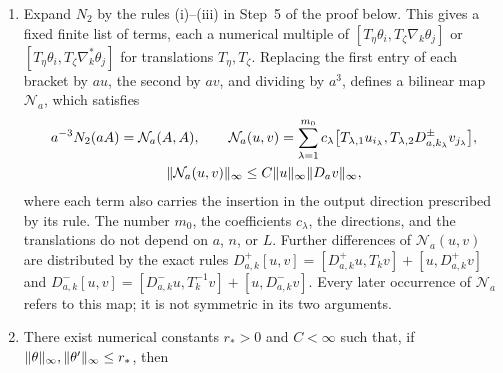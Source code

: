 \begin{lemma}
\begin{enumerate}
\[\]
With $\mathcal J(\theta)=(e^{\ad\theta}-\Id)/\ad\theta$, the resulting velocity in logarithmic coordinates is $\mathcal J(\theta)^{-1}(-4\nabla\sum_pq+G_U\phi)$, and it has the expansion
\[
 \begin{gathered}
 \partial_s\theta=-H_0\theta+N_2(\theta)+R_3(\theta),\qquad
 N_2=-C_0^*\mathfrak q-D\mathfrak q(\theta)^*C_0\theta+G_2(\theta),\\
 (G_2)_i(x)=\frac12\bigl[\theta_i(x),(d_0^*\theta)(x)+(d_0^*\theta)(x+ae_i)\bigr].
 \end{gathered}
\]
The adjoint is given by
\[
 z_{p,k}=\frac12\Bigl[\sum_{l>k}v_{p,l}-\sum_{l<k}v_{p,l},\,y_p\Bigr],\qquad
 D\mathfrak q(\theta)^*y=\sum_{p,k}\epsilon_{p,k}T_{p,k}^*z_{p,k},
\]
where $v_{p,k}=\epsilon_{p,k}T_{p,k}\theta_{\mathrm{dir}(p,k)}$ with $\epsilon_{p,k}\in\{\pm1\}$ and a translation $T_{p,k}$, and $T_{p,k}^*$ also inserts the result in the direction $\mathrm{dir}(p,k)$.
\item Expand $N_2$ by the rules (i)--(iii) in Step~5 of the proof below. This gives a fixed finite list of terms, each a numerical multiple of $[T_\eta\theta_i,T_\zeta\nabla_k\theta_j]$ or $[T_\eta\theta_i,T_\zeta\nabla_k^*\theta_j]$ for translations $T_\eta,T_\zeta$. Replacing the first entry of each bracket by $au$, the second by $av$, and dividing by $a^3$, defines a bilinear map $\mathcal N_a$, which satisfies
\begin{equation}\label{ch21:eq:Na-form}
 \begin{gathered}
 a^{-3}N_2(aA)=\mathcal N_a(A,A),\qquad
 \mathcal N_a(u,v)=\sum_{\lambda=1}^{m_0}c_\lambda\bigl[T_{\lambda,1}u_{i_\lambda},T_{\lambda,2}D_{a,k_\lambda}^{\pm}v_{j_\lambda}\bigr],\\
 \lVert \mathcal N_a(u,v)\rVert_\infty\le C\lVert u\rVert_\infty\lVert D_av\rVert_\infty ,
 \end{gathered}
\end{equation}
where each term also carries the insertion in the output direction prescribed by its rule. The number $m_0$, the coefficients $c_\lambda$, the directions, and the translations do not depend on $a$, $n$, or $L$. Further differences of $\mathcal N_a(u,v)$ are distributed by the exact rules $D_{a,k}^+[u,v]=[D_{a,k}^+u,T_kv]+[u,D_{a,k}^+v]$ and $D_{a,k}^-[u,v]=[D_{a,k}^-u,T_k^{-1}v]+[u,D_{a,k}^-v]$. Every later occurrence of $\mathcal N_a$ refers to this map; it is not symmetric in its two arguments.
\item There exist numerical constants $r_*>0$ and $C<\infty$ such that, if $\lVert \theta\rVert_\infty,\lVert \theta'\rVert_\infty\le r_*$, then

\end{enumerate}
\end{lemma}
